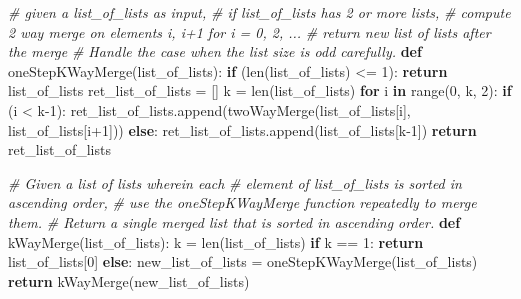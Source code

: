 \documentclass[
]{article}
\newenvironment{Shaded}{}{}
\newcommand{\BuiltInTok}[1]{\textcolor[rgb]{0.00,0.50,0.00}{#1}}
\newcommand{\CommentTok}[1]{\textcolor[rgb]{0.38,0.63,0.69}{\textit{#1}}}
\newcommand{\ControlFlowTok}[1]{\textcolor[rgb]{0.00,0.44,0.13}{\textbf{#1}}}
\newcommand{\DecValTok}[1]{\textcolor[rgb]{0.25,0.63,0.44}{#1}}
\newcommand{\KeywordTok}[1]{\textcolor[rgb]{0.00,0.44,0.13}{\textbf{#1}}}
\newcommand{\NormalTok}[1]{#1}
\newcommand{\OperatorTok}[1]{\textcolor[rgb]{0.40,0.40,0.40}{#1}}
\begin{document}
\begin{Shaded}
\begin{Highlighting}[]
\CommentTok{\# given a list\_of\_lists as input, }
\CommentTok{\#   if list\_of\_lists has 2 or more lists, }
\CommentTok{\#        compute 2 way merge on elements i, i+1 for i = 0, 2, ...}
\CommentTok{\#   return new list of lists after the merge}
\CommentTok{\#   Handle the case when the list size is odd carefully.}
\KeywordTok{def}\NormalTok{ oneStepKWayMerge(list\_of\_lists):}
    \ControlFlowTok{if}\NormalTok{ (}\BuiltInTok{len}\NormalTok{(list\_of\_lists) }\OperatorTok{\textless{}=} \DecValTok{1}\NormalTok{):}
        \ControlFlowTok{return}\NormalTok{ list\_of\_lists}
\NormalTok{    ret\_list\_of\_lists }\OperatorTok{=}\NormalTok{ []}
\NormalTok{    k }\OperatorTok{=} \BuiltInTok{len}\NormalTok{(list\_of\_lists)}
    \ControlFlowTok{for}\NormalTok{ i }\KeywordTok{in} \BuiltInTok{range}\NormalTok{(}\DecValTok{0}\NormalTok{, k, }\DecValTok{2}\NormalTok{):}
        \ControlFlowTok{if}\NormalTok{ (i }\OperatorTok{\textless{}}\NormalTok{ k}\OperatorTok{{-}}\DecValTok{1}\NormalTok{):}
\NormalTok{            ret\_list\_of\_lists.append(twoWayMerge(list\_of\_lists[i], list\_of\_lists[i}\OperatorTok{+}\DecValTok{1}\NormalTok{]))}
        \ControlFlowTok{else}\NormalTok{: }
\NormalTok{            ret\_list\_of\_lists.append(list\_of\_lists[k}\OperatorTok{{-}}\DecValTok{1}\NormalTok{])}
    \ControlFlowTok{return}\NormalTok{ ret\_list\_of\_lists}
    
\end{Highlighting}
\end{Shaded}

\begin{Shaded}
\begin{Highlighting}[]
\CommentTok{\# Given a list of lists wherein each }
\CommentTok{\#    element of list\_of\_lists is sorted in ascending order,}
\CommentTok{\# use the oneStepKWayMerge function repeatedly to merge them.}
\CommentTok{\# Return a single merged list that is sorted in ascending order.}
\KeywordTok{def}\NormalTok{ kWayMerge(list\_of\_lists):}
\NormalTok{    k }\OperatorTok{=} \BuiltInTok{len}\NormalTok{(list\_of\_lists)}
    \ControlFlowTok{if}\NormalTok{ k }\OperatorTok{==} \DecValTok{1}\NormalTok{:}
        \ControlFlowTok{return}\NormalTok{ list\_of\_lists[}\DecValTok{0}\NormalTok{]}
    \ControlFlowTok{else}\NormalTok{:}
\NormalTok{        new\_list\_of\_lists }\OperatorTok{=}\NormalTok{ oneStepKWayMerge(list\_of\_lists)}
        \ControlFlowTok{return}\NormalTok{ kWayMerge(new\_list\_of\_lists)}
\end{Highlighting}
\end{Shaded}
\end{document}
